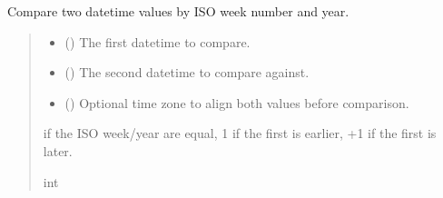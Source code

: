 \documentclass[letterpaper,10pt,english]{sphinxmanual}
\begin{document}
\begin{fulllineitems}
\begin{fulllineitems}
\label{\detokenize{apache_commons_validator_python.routines:apache_commons_validator_python.routines.date_validator.DateValidator.compare_weeks}}
\pysigstartsignatures
{}
\pysigstopsignatures
\sphinxAtStartPar
Compare two datetime values by ISO week number and year.
\begin{quote}\begin{description}
\begin{itemize}
\item {} 
\sphinxAtStartPar
{} () \textendash{} The first datetime to compare.

\item {} 
\sphinxAtStartPar
{} () \textendash{} The second datetime to compare against.

\item {} 
\sphinxAtStartPar
{} (\sphinxstyleliteralemphasis{\sphinxupquote{{[}}}\sphinxstyleliteralemphasis{\sphinxupquote{{]}}}) \textendash{} Optional time zone to align both values before comparison.

\end{itemize}

 if the ISO week/year are equal,
\sphinxhyphen{}1 if the first is earlier,
+1 if the first is later.

\sphinxAtStartPar
int

\end{description}\end{quote}

\end{fulllineitems}


\end{fulllineitems}
\end{document}
